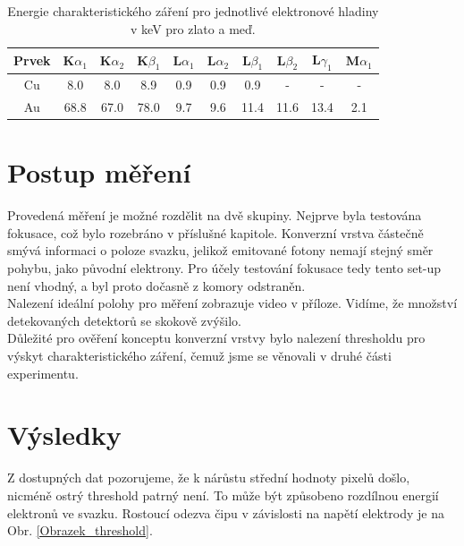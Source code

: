 \begin{table}
\begin{tabular}{|c|c|c|c|c|c|c|c|c|c|}
     \hline 
     Prvek & K$\alpha_1$ & K$\alpha_2$ & K$\beta_1$ & L$\alpha_1$ & L$\alpha_2$ & L$\beta_1$ & L$\beta_2$ & L$\gamma_1$ & M$\alpha_1$ \\ 
     \hline 
     Cu & 8.0 & 8.0 & 8.9 & 0.9 & 0.9 & 0.9 & - & - & - \\ 
     \hline 
     Au & 68.8 & 67.0 & 78.0 & 9.7 & 9.6 & 11.4 & 11.6 & 13.4 & 2.1 \\ 
     \hline 
     \end{tabular}
     \caption{Energie charakteristického záření pro jednotlivé elektronové hladiny v keV pro zlato a meď.}   
     \label{Tabulka1}
     \end{table}   

\section{Postup měření}
Provedená měření je možné rozdělit na dvě skupiny. Nejprve byla testována fokusace, což bylo rozebráno v příslušné kapitole. Konverzní vrstva částečně smývá informaci o poloze svazku, jelikož emitované fotony nemají stejný směr pohybu, jako původní elektrony. Pro účely testování fokusace tedy tento set-up není vhodný, a byl proto dočasně z komory odstraněn.\\
Nalezení ideální polohy pro měření zobrazuje video v příloze. Vidíme, že množství detekovaných detektorů se skokově zvýšilo.\\
Důležité pro ověření konceptu konverzní vrstvy bylo nalezení thresholdu pro výskyt charakteristického záření, čemuž jsme se věnovali v druhé části experimentu.

\section{Výsledky}
Z dostupných dat pozorujeme, že k nárůstu střední hodnoty pixelů došlo, nicméně ostrý threshold patrný není. To může být způsobeno rozdílnou energií elektronů ve svazku. Rostoucí odezva čipu v závislosti na napětí elektrody je na Obr. \ref{Obrazek_threshold}.

